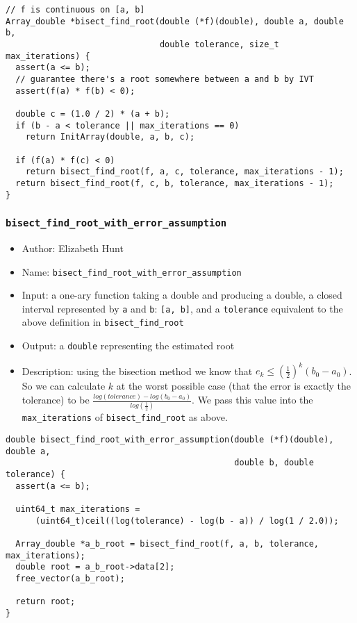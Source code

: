\documentclass[11pt]{article}
\begin{document}
\begin{verbatim}
// f is continuous on [a, b]
Array_double *bisect_find_root(double (*f)(double), double a, double b,
                               double tolerance, size_t max_iterations) {
  assert(a <= b);
  // guarantee there's a root somewhere between a and b by IVT
  assert(f(a) * f(b) < 0);

  double c = (1.0 / 2) * (a + b);
  if (b - a < tolerance || max_iterations == 0)
    return InitArray(double, a, b, c);

  if (f(a) * f(c) < 0)
    return bisect_find_root(f, a, c, tolerance, max_iterations - 1);
  return bisect_find_root(f, c, b, tolerance, max_iterations - 1);
}
\end{verbatim}
\subsubsection{\texttt{bisect\_find\_root\_with\_error\_assumption}}
\label{sec:org762134e}
\begin{itemize}
\item Author: Elizabeth Hunt
\item Name: \texttt{bisect\_find\_root\_with\_error\_assumption}
\item Input: a one-ary function taking a double and producing a double, a closed interval represented
by \texttt{a} and \texttt{b}: \texttt{[a, b]}, and a \texttt{tolerance} equivalent to the above definition in \texttt{bisect\_find\_root}
\item Output: a \texttt{double} representing the estimated root
\item Description: using the bisection method we know that \(e_k \le (\frac{1}{2})^k (b_0 - a_0)\). So we can
calculate \(k\) at the worst possible case (that the error is exactly the tolerance) to be
\(\frac{log(tolerance) - log(b_0 - a_0)}{log(\frac{1}{2})}\). We pass this value into the \texttt{max\_iterations}
of \texttt{bisect\_find\_root} as above.
\end{itemize}
\begin{verbatim}
double bisect_find_root_with_error_assumption(double (*f)(double), double a,
                                              double b, double tolerance) {
  assert(a <= b);

  uint64_t max_iterations =
      (uint64_t)ceil((log(tolerance) - log(b - a)) / log(1 / 2.0));

  Array_double *a_b_root = bisect_find_root(f, a, b, tolerance, max_iterations);
  double root = a_b_root->data[2];
  free_vector(a_b_root);

  return root;
}
\end{verbatim}
\end{document}
